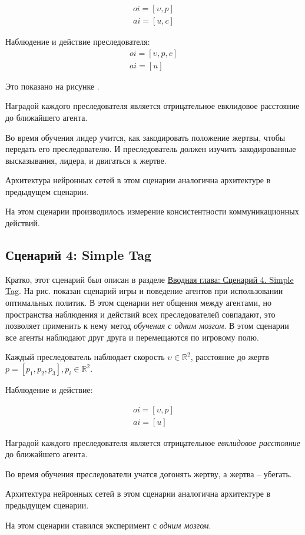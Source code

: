 \begin{equation}
    \begin{multlined}
        oi = [\upsilon, p] \\
        ai = [u, c]
    \end{multlined}
\end{equation}

Наблюдение и действие преследователя:
\begin{equation}
    \begin{multlined}
        oi = [\upsilon, p, c] \\
        ai = [u]
    \end{multlined}
\end{equation}

Это показано на рисунке .

Наградой каждого преследователя является отрицательное евклидовое расстояние до ближайшего агента.

Во время обучения лидер учится, как закодировать положение жертвы, чтобы передать его преследователю. И преследователь должен изучить закодированные высказывания, лидера, и двигаться к жертве.

Архитектура нейронных сетей в этом сценарии аналогична архитектуре в предыдущем сценарии.

На этом сценарии производилось измерение консистентности коммуникационных действий.

\subsection{Сценарий 4: Simple Tag} \label{exp-st}

Кратко, этот сценарий был описан в разделе \hyperref[intro-st]{Вводная глава: Сценарий 4. Simple Tag}. На рис.  показан сценарий игры и поведение агентов при использовании оптимальных политик. В этом сценарии нет общения между агентами, но пространства наблюдения и действий всех преследователей совпадают, это позволяет применить к нему метод \textit{обучения с одним мозгом}. В этом сценарии все агенты наблюдают друг друга и перемещаются по игровому полю.

Каждый преследователь наблюдает скорость $\upsilon \in \mathbb{R}^2$, расстояние до жертв $p = [p_1, p_2, p_3], p_i \in \mathbb{R}^2$.

Наблюдение и действие:

\begin{equation}
    \begin{multlined}
        oi = [\upsilon, p] \\
        ai = [u]
    \end{multlined}
\end{equation}

Наградой каждого преследователя является отрицательное \textit{евклидовое расстояние} до ближайшего агента.

Во время обучения преследователи учатся догонять жертву, а жертва – убегать.

Архитектура нейронных сетей в этом сценарии аналогична архитектуре в предыдущем сценарии.

На этом сценарии ставился эксперимент с \textit{одним мозгом}.

\newpage
